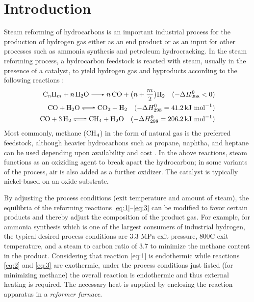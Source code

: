 \chapter{Introduction} \label{ch:introduction}

Steam reforming of hydrocarbons is an important industrial process for the production of hydrogen gas either as an end product or as an input for other processes such as ammonia synthesis and petroleum hydrocracking. In the steam reforming process, a hydrocarbon feedstock is reacted with steam, usually in the presence of a catalyst, to yield hydrogen gas and byproducts according to the following reactions \cite{rostrup-nielsen_catalytic_1984}:
\begin{align}
\ce{C_{n}H_{m} + n H2O -> n CO + } \bigl(n + \frac{m}{2}\bigr) \ce{H2} \quad (-\Delta{}H^{0}_{298} < 0) \label{eq:1} \\
\ce{CO + H2O <=> CO2 + H2} \quad (-\Delta{}H^{0}_{298} = 41.2 \, \text{kJ mol}^{-1}) \label{eq:2} \\
\ce{CO + 3H2 <=> CH4 + H2O} \quad (-\Delta{}H^{0}_{298} = 206.2 \, \text{kJ mol}^{-1}) \label{eq:3}
\end{align}
Most commonly, methane (CH$_{\textnormal{4}}$) in the form of natural gas is the preferred feedstock, although heavier hydrocarbons such as propane, naphtha, and heptane can be used depending upon availability and cost \cite{rostrup-nielsen_catalytic_1984,haussinger_hydrogen_2000}. In the above reactions, steam functions as an oxiziding agent to break apart the hydrocarbon; in some variants of the process, air is also added as a further oxidizer. The catalyst is typically nickel-based on an oxide substrate.

By adjusting the process conditions (exit temperature and amount of steam), the equilibria of the reforming reactions \ref{eq:1}--\ref{eq:3} can be modified to favor certain products and thereby adjust the composition of the product gas. For example, for ammonia synthesis which is one of the largest consumers of industrial hydrogen, the typical desired process conditions are 3.3 MPa exit pressure, 800C exit temperature, and a steam to carbon ratio of 3.7 \cite{rostrup-nielsen_catalytic_1984} to minimize the methane content in the product. Considering that reaction \ref{eq:1} is endothermic while reactions \ref{eq:2} and \ref{eq:3} are exothermic, under the process conditions just listed (for minimizing methane) the overall reaction is endothermic and thus external heating is required. The necessary heat is supplied by enclosing the reaction apparatus in a \emph{reformer furnace}.

